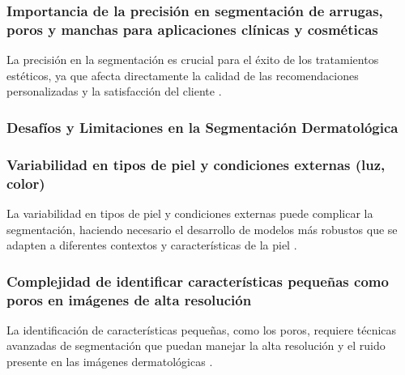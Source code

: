 \subsubsection{Importancia de la precisión en segmentación de arrugas, poros y manchas para aplicaciones clínicas y cosméticas}
La precisión en la segmentación es crucial para el éxito de los tratamientos estéticos, ya que afecta directamente la calidad de las recomendaciones personalizadas y la satisfacción del cliente \cite{chuchu2020}.

\subsubsection{Desafíos y Limitaciones en la Segmentación Dermatológica}

\subsubsection{Variabilidad en tipos de piel y condiciones externas (luz, color)}
La variabilidad en tipos de piel y condiciones externas puede complicar la segmentación, haciendo necesario el desarrollo de modelos más robustos que se adapten a diferentes contextos y características de la piel \cite{zhao2021}.

\subsubsection{Complejidad de identificar características pequeñas como poros en imágenes de alta resolución}
La identificación de características pequeñas, como los poros, requiere técnicas avanzadas de segmentación que puedan manejar la alta resolución y el ruido presente en las imágenes dermatológicas \cite{yang2020}.
